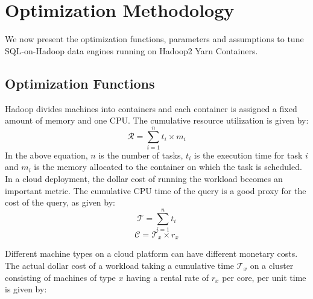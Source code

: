 \section{Optimization Methodology}
\label{sec:optmethod}
We now present the optimization functions, parameters and assumptions to tune SQL-on-Hadoop data engines running on Hadoop2 Yarn Containers. 

\subsection{Optimization Functions}
 Hadoop divides machines into containers and each container is assigned a fixed amount of memory and one CPU.  The cumulative resource utilization is given by:
\begin{equation}
\label{eqn:totalresource}
\mathcal{R} = \sum_{i=1}^{n} t_i \times m_i
\end{equation}
In the above equation, $n$ is the number of tasks, $t_i$ is the execution time for task $i$ and $m_i$ is the memory allocated to the container on which the task is scheduled.  In a cloud deployment, the dollar cost of running the workload becomes an important metric.  The cumulative CPU time of the query is a good proxy for the cost of the query, as given by:
\begin{equation}
\label{eqn:totaltime}
\mathcal{T} = \sum_{i=1}^{n} t_i
\end{equation}
\begin{equation}
\label{eqn:totalcost}
\mathcal{C} = \mathcal{T}_x \times r_x
\end{equation}


Different machine types on a cloud platform can have different monetary costs. The actual dollar cost of a workload taking a cumulative time $\mathcal{T}_x$ on a cluster consisting of machines of type $x$ having a rental rate of $r_x$ per core, per unit time is given by:
